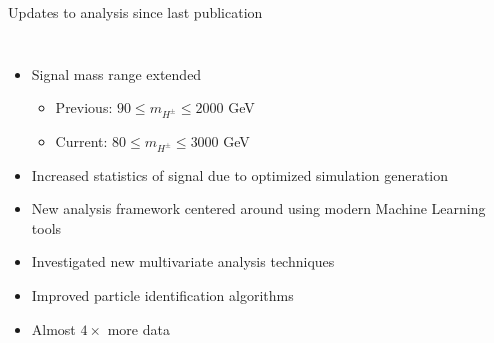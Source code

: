 \documentclass[aspectratio=169,xcolor=table]{beamer}
\begin{document}
  \begin{frame}[t]{Updates to analysis since last publication}
      \begin{columns}
        \begin{itemize}
          \item Signal mass range extended 
          \begin{itemize}
            \item Previous: $90 \leq m_{H^{\pm}} \leq 2000$ GeV
            \item Current:  $80 \leq m_{H^{\pm}} \leq 3000$ GeV
          \end{itemize}
          \item Increased statistics of signal due to optimized simulation generation
          \item New analysis framework centered around using modern Machine Learning tools
          \item Investigated new multivariate analysis techniques
          \item Improved particle identification algorithms
          \item Almost $4\times$ more data
        \end{itemize}


\end{columns}
\end{frame}
\end{document}
